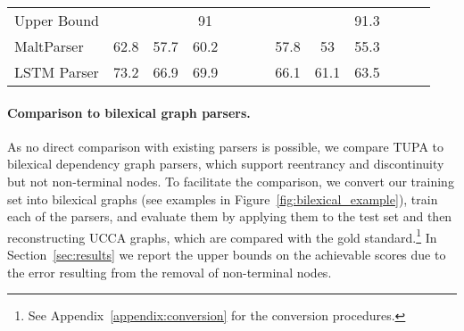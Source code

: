 \documentclass[11pt,a4paper]{article}
\newcommand{\parser}[1]{TUPA\textsubscript{#1}}
\newcommand{\secref}[1]{Section~\ref{#1}}
\newcommand{\figref}[1]{Figure~\ref{#1}}
\begin{document}
\begin{table*}
\begin{tabular}{l|ccc|ccc||ccc|ccc}
\small Upper Bound
& & & \small 91 & & &
& & & \small 91.3 \\
MaltParser
& 62.8 & 57.7 & 60.2 & & &
& 57.8 & 53 & 55.3 \\
LSTM Parser
& 73.2 & 66.9 & 69.9 & & &
& 66.1 & 61.1 & 63.5
\end{tabular}
\caption{
  Experimental results, in percents, on the \textit{Wiki} test set (left)
  and the \textit{20K Leagues} set (right).
  Columns correspond to labeled precision, recall and F-score,
  for both primary and remote edges.
  \parser{BiLSTM} obtains the highest F-scores in all metrics, surpassing the
  bilexical parsers, tree parsers and other classifiers.
}
\label{table:results}
\end{table*}

\paragraph{Comparison to bilexical graph parsers.}
As no direct comparison with existing parsers is possible,
we compare \parser{} to bilexical dependency graph parsers,
which support reentrancy and discontinuity but not non-terminal nodes.
To facilitate the comparison, we convert our training set into bilexical graphs
(see examples in \figref{fig:bilexical_example}),
train each of the parsers,
and evaluate them by applying them to the test set
and then reconstructing UCCA graphs, which are compared with the gold standard.\footnote{See
Appendix~\ref{appendix:conversion} for the conversion procedures.}
In \secref{sec:results} we report the upper bounds on the achievable scores due to the error resulting from the removal of non-terminal nodes.
\end{document}
